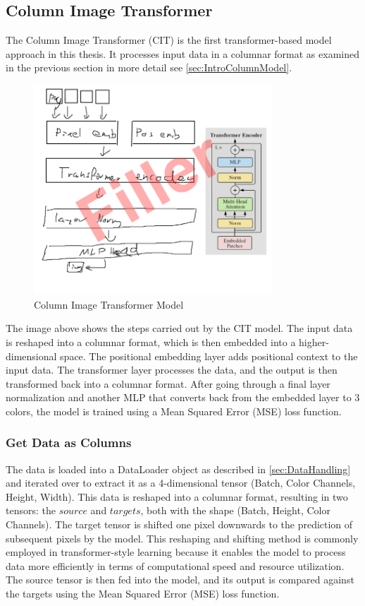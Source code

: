 \subsection{Column Image Transformer}
    
    The Column Image Transformer (CIT) is the first transformer-based model approach in this thesis. It processes input data in a columnar format as examined in the previous section in more detail see \autoref{sec:IntroColumnModel}.


    \begin{figure}[H]
        \centering
        \includegraphics[width=0.8\textwidth]{imgs/CITModel.png}
        \caption{Column Image Transformer Model}
        \label{fig:ColumnImageTransformer}
    \end{figure}

    The image above shows the steps carried out by the CIT model. The input data is reshaped into a columnar format, which is then embedded into a higher-dimensional space. The positional embedding layer adds positional context to the input data. The transformer layer processes the data, and the output is then transformed back into a columnar format. After going through a final layer normalization and another MLP that converts back from the embedded layer to 3 colors, the model is trained using a Mean Squared Error (MSE) loss function.

    \subsubsection{Get Data as Columns}

    The data is loaded into a DataLoader object as described in \autoref{sec:DataHandling} and iterated over to extract it as a 4-dimensional tensor (Batch, Color Channels, Height, Width). This data is reshaped into a columnar format, resulting in two tensors: the \(source\) and \(targets\), both with the shape (Batch, Height, Color Channels). The target tensor is shifted one pixel downwards to the prediction of subsequent pixels by the model. This reshaping and shifting method is commonly employed in transformer-style learning because it enables the model to process data more efficiently in terms of computational speed and resource utilization. The source tensor is then fed into the model, and its output is compared against the targets using the Mean Squared Error (MSE) loss function.


